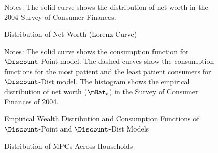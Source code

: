 \begin{figure}
\caption{Distribution of Net Worth (Lorenz Curve)}
\label{CumWLevSCFCastanedaAndDistSevenNoAggShockPlot}
\footnotesize Notes: The solid curve shows the distribution of net worth in the 2004 Survey of Consumer Finances.
\end{figure}
\begin{figure}
\caption{Empirical Wealth Distribution and Consumption Functions of
$\Discount$-Point and $\Discount$-Dist Models}
\label{CFuncDistSevenPointPermAndHistNetWorthPlotFedQuarterly}
\footnotesize Notes: The solid curve shows the consumption function
for $\Discount$-Point model.  The dashed curves show the consumption functions
for the most patient and the least patient consumers for
$\Discount$-Dist model. The histogram shows the empirical distribution of
net worth ($\mRat_{t}$) in the Survey of Consumer Finances of 2004.
\end{figure}
\begin{figure}
\caption{Distribution of MPCs Across Households}
\label{MPCdist}
\end{figure}
